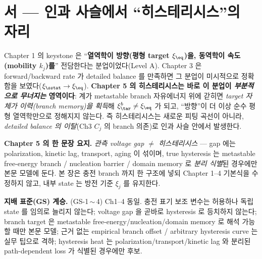 
\section*{서 — 인과 사슬에서 ``히스테리시스''의 자리}
Chapter 1 의 keystone 은 ``\textbf{열역학이 방향(평형 target $\xi_{\eq}$)을, 동역학이 속도(mobility $k_j$)를}''
전담한다는 분업이었다(Level A). Chapter 3 은 forward/backward rate 가 detailed balance 를 만족하면 그 분업이
미시적으로 정확함을 보였다($\xi_{\sstat}\to\xi_{\eq}$). \textbf{Chapter 5 의 히스테리시스는 바로 이 분업이
\emph{부분적으로 무너지는} 영역이다}: 계가 metastable branch 자유에너지 위에 갇히면 \emph{target 자체가
이력(branch memory)을 획득}해 $\xi_{\tar}^b\ne\xi_{\eq}$ 가 되고, ``방향''이 더 이상 순수 평형 열역학만으로
정해지지 않는다. 즉 히스테리시스는 새로운 피팅 곡선이 아니라, \emph{detailed balance 의 이탈}(Ch3 $C_j$ 의
branch 의존)로 인과 사슬 안에서 발생한다.

\textbf{Chapter 5 의 한 문장 요지.} \emph{관측 voltage gap $\ne$ 히스테리시스} — gap 에는 polarization,
kinetic lag, transport, aging 이 섞이며, true hysteresis 는 metastable free-energy branch / nucleation
barrier / domain memory 로 \emph{분리 식별}된 경우에만 본문 모델에 둔다. 본 장은 충전 branch 까지 한 구조에
넣되 Chapter 1--4 기본식을 수정하지 않고, 내부 state 는 방전 기준 $\xi_j$ 를 유지한다.

\begin{groundingbox}
\textbf{지배 표준(GS) 계승.} (GS-1\,$\sim$\,4) Ch1--4 동일. 충전 표기 보조 변수는 허용하나 독립 state 를
임의로 늘리지 않는다; voltage gap 을 곧바로 hysteresis 로 등치하지 않는다; branch target 은 metastable
free-energy/nucleation/domain memory 로 해석 가능할 때만 본문 모델; 근거 없는 empirical branch offset /
arbitrary hysteresis curve 는 실무 팁으로 격하; hysteresis heat 는 polarization/transport/kinetic lag 와
분리된 path-dependent loss 가 식별된 경우에만 후보.
\end{groundingbox}


